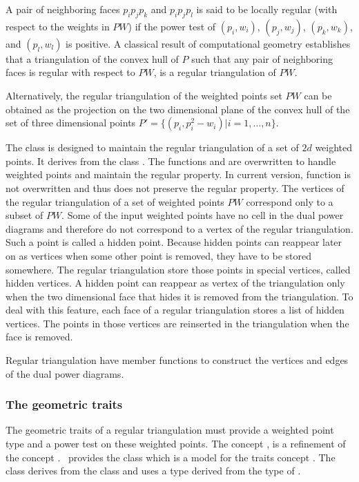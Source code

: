 A pair of neighboring faces $p_ip_jp_k$
and $p_ip_jp_l$ is said to be locally regular
(with respect to  the weights in ${  PW}$)
if the power test of $(p_i, w_i)$, $(p_j, w_j)$, $(p_k, w_k)$,
and $(p_l, w_l)$ is positive.
A classical  result of computational geometry
establishes that a triangulation of the convex hull of ${  P}$
such that any pair of neighboring faces is regular with respect
to ${  PW}$, is a
 regular triangulation of ${  PW}$.

Alternatively, the regular triangulation
of the weighted points set ${  PW}$
can be obtained as the projection
on the two dimensional plane of the convex hull of the set of three
dimensional points 
${  P'}= \{ (p_i,p_i ^2 - w_i ) | i = 1, \ldots , n \}$.

The class 
 is designed to maintain the
regular triangulation of a set of $2d$ weighted points.
It derives from the class .
The functions  and 
 are overwritten to handle weighted points
and maintain the regular
property.
In current version, function  is not 
overwritten and thus does not preserve the regular property.
The vertices of the regular triangulation
of a set of weighted points ${PW}$ correspond  only to a subset
of ${PW}$.
Some of the input
weighted points have no cell in the dual power diagrams
and therefore do not correspond to a vertex of the regular
triangulation.
Such a point is called a hidden point.
Because hidden points can reappear later on as vertices
when  some other point is removed,
they  have to be stored somewhere. 
The regular triangulation  store those points in special vertices, called
hidden vertices. 
A hidden point can reappear as vertex of the triangulation
only when the two dimensional face that hides it
is removed from the triangulation. To deal with this feature,
each face of a regular triangulation stores a list of hidden vertices.
The points in those vertices 
are reinserted in the triangulation  when the face
is removed.

Regular triangulation have member functions to construct
the vertices and edges of the dual power diagrams.

\subsubsection{The geometric traits}
The geometric traits of a regular triangulation
must provide a weighted point type
and a power test on these weighted points.
The concept 
,
is a refinement of the concept
. \cgal\ provides 
the class
which is a model for the traits concept
.
The class 
derives  from the class
and uses a  type
derived from the type  of
.

